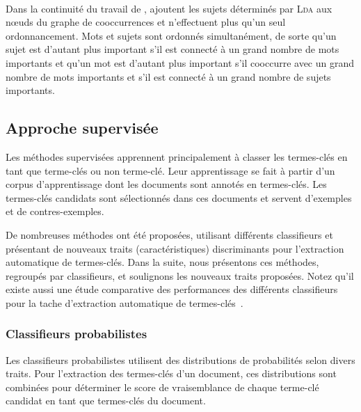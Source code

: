         ~\\Dans la continuité du travail de ,
         ajoutent les sujets déterminés par
        \textsc{Lda} aux n\oe{}uds du graphe de cooccurrences et n'effectuent
        plus qu'un seul ordonnancement. Mots et sujets sont ordonnés
        simultanément, de sorte qu'un sujet est d'autant plus important
        s'il est connecté à un grand nombre de mots importants et qu'un mot est
        d'autant plus important s'il cooccurre avec un grand nombre de mots
        importants et s'il est connecté à un grand nombre de sujets importants.

    \subsection{Approche supervisée}
    \label{subsec:main-state_of_the_art-automatic_keyphrase_extraction-supervised_keyphrase_extraction}
      Les méthodes supervisées apprennent principalement à classer les
      termes-clés en tant que \og{}terme-clés\fg{} ou \og{}non terme-clé\fg{}.
      Leur apprentissage se fait à partir d'un corpus d'apprentissage dont les
      documents sont annotés en termes-clés. Les termes-clés candidats sont
      sélectionnés dans ces documents et servent d'exemples et de
      contres-exemples.

      De nombreuses méthodes ont été proposées, utilisant différents
      classifieurs et présentant de nouveaux traits (caractéristiques)
      discriminants pour l'extraction automatique de termes-clés. Dans la suite,
      nous présentons ces méthodes, regroupés par classifieurs, et soulignons
      les nouveaux traits proposées. Notez qu'il existe aussi une étude
      comparative des performances des différents classifieurs pour la tache
      d'extraction automatique de
      termes-clés~\cite{sarkar2012machinelearningcomparison}.

      \subsubsection{Classifieurs probabilistes}
      \label{subsubsec:main-state_of_the_art-automatic_keyphrase_extraction-supervised_keyphrase_extraction-probabilistic_models}
        Les classifieurs probabilistes utilisent des distributions de
        probabilités selon divers traits. Pour l'extraction des termes-clés d'un
        document, ces distributions sont combinées pour déterminer le score de
        vraisemblance de chaque terme-clé candidat en tant que termes-clés du
        document.

